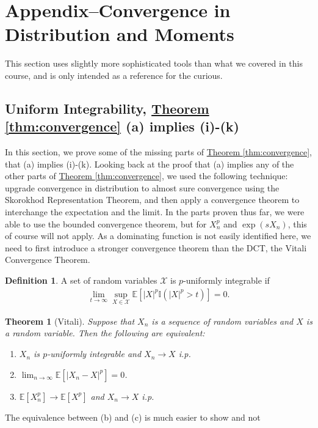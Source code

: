 \documentclass{article}
\newtheorem{theorem}{Theorem}
\theoremstyle{definition}
\newtheorem{definition}{Definition}
\newcommand{\E}{\mathbb E}
\newcommand{\1}{\mathbb I}
\newcommand{\thmhref}[1]{\hyperref[#1]{Theorem \ref{#1}}}
\begin{document}
\section{Appendix--Convergence in Distribution and  Moments}

This section uses slightly more sophisticated tools than what we
covered in this course, and is only intended as a reference for the
curious.

\subsection{Uniform Integrability, \thmhref{thm:convergence} (a) implies (i)-(k)}

In this section, we prove some of the missing parts of
\thmhref{thm:convergence}, that (a) implies (i)-(k).  Looking back at
the proof that (a) implies any of the other parts of
\thmhref{thm:convergence}, we used the following technique: upgrade
convergence in distribution to almost sure convergence using the
Skorokhod Representation Theorem, and then apply a convergence theorem
to interchange the expectation and the limit.  In the parts proven
thus far, we were able to use the bounded convergence theorem, but for
$X_n^p$ and $\exp(sX_n)$, this of course will not apply.  As a
dominating function is not easily identified here, we need to first
introduce a stronger convergence theorem than the DCT, the Vitali
Convergence Theorem.
\begin{definition}
  A set of random variables $\mathcal X$ is $p$-uniformly integrable if
  \begin{align}
    \label{eq:uniformIntegrability}
    \lim_{t \to \infty} \sup_{X \in \mathcal X} \E[|X|^p\1(|X|^p > t)] = 0.
  \end{align}
\end{definition}
\begin{theorem}[Vitali]
  \label{thm:vitali}
  Suppose that $X_n$ is a sequence of random variables and $X$ is a random variable.  Then the following are equivalent:
  \begin{enumerate}
  \item [a.] $X_n$ is $p$-uniformly integrable and $X_n \to X$ i.p.
  \item [b.] $\lim_{n \to \infty} \E[|X_n - X|^p] = 0$.
  \item [c.] $\E[X_n^p] \to \E[X^p]$ and $X_n \to X$ i.p.
  \end{enumerate}
\end{theorem}
The equivalence between (b) and (c) is much easier to show and not
\end{document}
